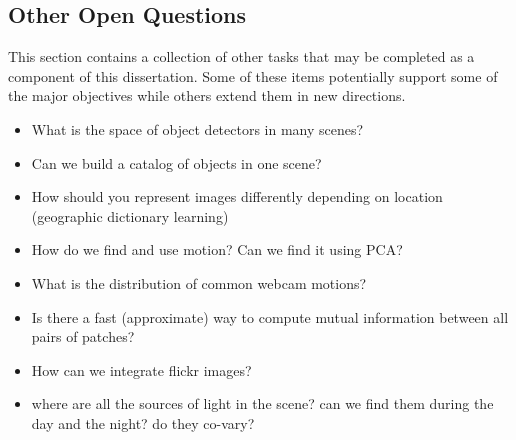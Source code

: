 \subsection{Other Open Questions}
\label{sec:misc}

This section contains a collection of other tasks that may be
completed as a component of this dissertation.  Some of these items
potentially support some of the major objectives while others extend
them in new directions.

\begin{itemize}

  \item What is the space of object detectors in many scenes?

  \item Can we build a catalog of objects in one scene?

  \item How should you represent images differently depending on
    location (geographic dictionary learning)

  \item How do we find and use motion?  Can we find it using PCA?

  \item What is the distribution of common webcam motions?

  \item Is there a fast (approximate) way to compute mutual
    information between all pairs of patches?

  \item How can we integrate flickr images?

  \item where are all the sources of light in the scene?  can we find
    them during the day and the night?  do they co-vary?

\end{itemize}


